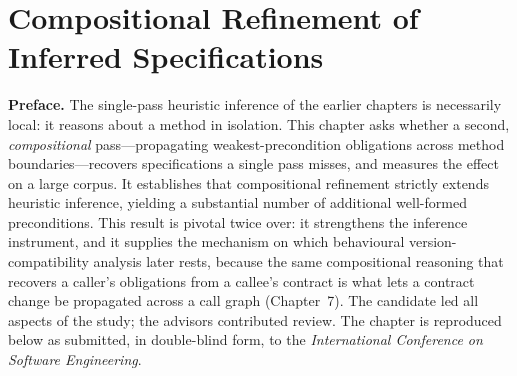 \chapter{Compositional Refinement of Inferred Specifications}
\label{ch:article3}

\noindent\textbf{Preface.} The single-pass heuristic inference of the earlier
chapters is necessarily local: it reasons about a method in isolation. This
chapter asks whether a second, \emph{compositional} pass---propagating
weakest-precondition obligations across method boundaries---recovers
specifications a single pass misses, and measures the effect on a large corpus.
It establishes that compositional refinement strictly extends heuristic inference,
yielding a substantial number of additional well-formed preconditions. This result
is pivotal twice over: it strengthens the inference instrument, and it supplies the
mechanism on which behavioural version-compatibility analysis later rests, because
the same compositional reasoning that recovers a caller's obligations from a
callee's contract is what lets a contract change be propagated across a call graph
(Chapter~7). The candidate led all aspects of the study; the advisors contributed
review. The chapter is reproduced below as submitted, in double-blind form, to the
\emph{International Conference on Software Engineering}.

\cleardoublepage

